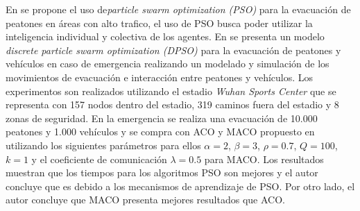 En \cite{izquierdo2009forecasting,zheng2012modeling} se propone el uso de\textit{particle swarm optimization (PSO)} para la evacuación de peatones en áreas con alto trafico, el uso de PSO busca poder utilizar la inteligencia individual y colectiva de los agentes.
En \cite{zong2014conflict} se presenta un modelo \textit{discrete particle swarm optimization (DPSO)} para la evacuación de peatones y vehículos en caso de emergencia realizando un modelado y simulación de los movimientos de evacuación e interacción entre peatones y vehículos.  Los experimentos son realizados utilizando el estadio \textit{Wuhan Sports Center} que se representa con 157 nodos dentro del estadio, 319 caminos fuera del estadio y 8 zonas de seguridad. En la emergencia se realiza una evacuación de 10.000 peatones y 1.000 vehículos y se compra con ACO y MACO propuesto en \cite{zong2010multi,zong2010multiflow} utilizando los siguientes parámetros para ellos $\alpha=2$, $\beta=3$, $\rho=0.7$, $Q=100$, $k=1$ y el coeficiente de comunicación $\lambda=0.5$ para MACO. Los resultados muestran 	que los tiempos para los algoritmos PSO son mejores y el autor concluye que es debido a los mecanismos de aprendizaje de PSO. Por otro lado, el autor concluye que MACO presenta mejores resultados que ACO.
